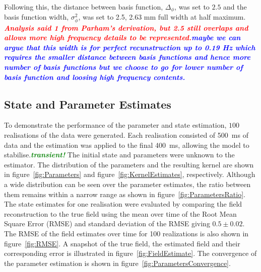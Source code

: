 \documentclass[twocolumn,11pt,a4paper]{article}		%
\newcommand{\parham}[1]{\textsf{\emph{\textbf{\textcolor{blue}{#1}}}}}
\newcommand{\mike}[1]{\textsf{\emph{\textbf{\textcolor{red}{#1}}}}}
\newcommand{\dean}[1]{\textsf{\emph{\textbf{\textcolor{green}{#1}}}}}
\begin{document}
Following this, the distance between basis function, $\Delta_{\phi}$, was set to $2.5$ and the basis function width, $\sigma_{\phi}^2$, was set to 2.5, 2.63 mm full width at half maximum. \mike{Analysis said 1 from Parham's derivation, but 2.5 still overlaps and allows more high frequency details to be represented.}\parham{maybe we can argue that this width is for perfect recunstruction up to 0.19 Hz which requires the smaller distance between basis functions and hence more number of basis functions but we choose to go for lower number of basis function and loosing high frequency contents.}

\subsection{State and Parameter Estimates} 
\label{sec:state_and_param_results}
To demonstrate the performance of the parameter and state estimation, $100$ realisations of the data were generated. Each realisation consisted of 500~ms of data and the estimation was applied to the final 400~ms, allowing the model to stabilise.\dean{transient!} The initial state and parameters were unknown to the estimator. The distribution of the parameters and the resulting kernel are shown in figure~\ref{fig:Parameters} and figure~\ref{fig:KernelEstimates}, respectively. Although a wide distribution can be seen over the parameter estimates, the ratio between them remains within a narrow range as shown in figure~\ref{fig:ParametersRatio}. The state estimates for one realisation were evaluated by comparing the field reconstruction to the true field using the mean over time of the Root Mean Square Error (RMSE) and standard deviation of the RMSE giving $0.5\pm 0.02$. The RMSE of the field estimates over time for 100 realizations is also shown in figure~\ref{fig:RMSE}. A snapshot of the true field, the estimated field and their corresponding error is illustrated in figure~\ref{fig:FieldEstimate}. The convergence of the parameter estimation is shown in figure~\ref{fig:ParametersConvergence}.
\end{document}
